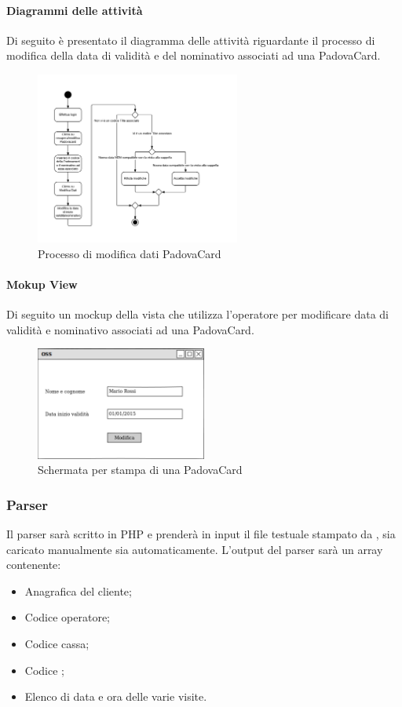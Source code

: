 \paragraph{Diagrammi delle attività}
Di seguito è presentato il diagramma delle attività riguardante il processo di modifica della data di validità e del nominativo associati ad una PadovaCard.
\begin{figure}[H]
\centering
\includegraphics[width=0.6\textwidth]{images/modifica_padovacard.png}
\caption{Processo di modifica dati PadovaCard}
\end{figure}

\paragraph{Mokup View}
Di seguito un mockup della vista che utilizza l'operatore per modificare data di validità e nominativo associati ad una PadovaCard.
\begin{figure}[H]
\centering
\includegraphics[width=0.5\textwidth]{images/mockup_modifica_tessera.png}
\caption{Schermata per stampa di una PadovaCard\label{modificaPadovaCard}}
\end{figure}


\subsubsection{Parser}
Il parser sarà scritto in PHP e prenderà in input il file testuale stampato da \tlite, sia caricato manualmente sia automaticamente. L'output del parser sarà un array contenente:
\begin{itemize}
	\item Anagrafica del cliente;
    \item Codice operatore;
    \item Codice cassa;
    \item Codice \tlite;
    \item Elenco di data e ora delle varie visite.
\end{itemize}

